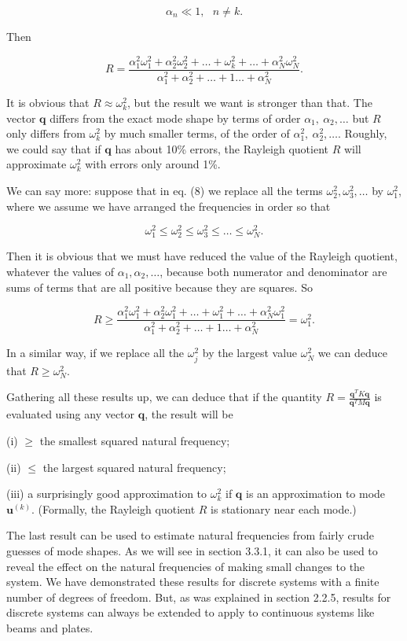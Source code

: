   $$\alpha_n \ll 1,~~~n \ne k .\tag{7}$$ 

  Then 

  $$R=\frac{\alpha_1^2 \omega_1^2 + \alpha_2^2 \omega_2^2 + \dots+ \omega_k^2 + 
  \dots + \alpha_N^2 \omega_N^2 }{\alpha_1^2 + \alpha_2^2 + \dots + 1 \dots + 
  \alpha_N^2 } .\tag{8}$$ 

  It is obvious that $R \approx \omega_k^2$, but the result we want is stronger 
  than that. The vector $\mathbf{q}$ differs from the exact mode shape by terms 
  of order $\alpha_1,~\alpha_2, \dots$ but $R$ only differs from $\omega_k^2$ 
  by much smaller terms, of the order of $\alpha_1^2,~\alpha_2^2, \dots$. 
  Roughly, we could say that if $\mathbf{q}$ has about 10\% errors, the 
  Rayleigh quotient $R$ will approximate $\omega_k^2$ with errors only around 
  1\%. 

  We can say more: suppose that in eq. (8) we replace all the terms 
  $\omega_2^2, \omega_3^2, \dots$ by $\omega_1^2$, where we assume we have 
  arranged the frequencies in order so that 

  $$\omega_1^2 \le \omega_2^2 \le \omega_3^2 \le \dots \le \omega_N^2 
  .\tag{9}$$ 

  Then it is obvious that we must have reduced the value of the Rayleigh 
  quotient, whatever the values of $\alpha_1, \alpha_2, \dots$, because both 
  numerator and denominator are sums of terms that are all positive because 
  they are squares. So 

  $$R \ge \frac{\alpha_1^2 \omega_1^2 + \alpha_2^2 \omega_1^2 + \dots+ 
  \omega_1^2 + \dots + \alpha_N^2 \omega_1^2 }{\alpha_1^2 + \alpha_2^2 + \dots 
  + 1 \dots + \alpha_N^2} = \omega_1^2 .\tag{10}$$ 

  In a similar way, if we replace all the $\omega_j^2$ by the largest value 
  $\omega_N^2$ we can deduce that $R \ge \omega_N^2$. 

  Gathering all these results up, we can deduce that if the quantity 
  $R=\frac{\mathbf{q}^T K \mathbf{q}}{\mathbf{q}^T M \mathbf{q}}$ is evaluated 
  using any vector $\mathbf{q}$, the result will be 

  (i) $\ge$ the smallest squared natural frequency; 

  (ii) $\le$ the largest squared natural frequency; 

  (iii) a surprisingly good approximation to $\omega_k^2$ if $\mathbf{q}$ is an 
  approximation to mode $\mathbf{u}^{(k)}$. (Formally, the Rayleigh quotient 
  $R$ is stationary near each mode.) 

  The last result can be used to estimate natural frequencies from fairly crude 
  guesses of mode shapes. As we will see in section 3.3.1, it can also be used 
  to reveal the effect on the natural frequencies of making small changes to 
  the system. We have demonstrated these results for discrete systems with a 
  finite number of degrees of freedom. But, as was explained in section 2.2.5, 
  results for discrete systems can always be extended to apply to continuous 
  systems like beams and plates. 